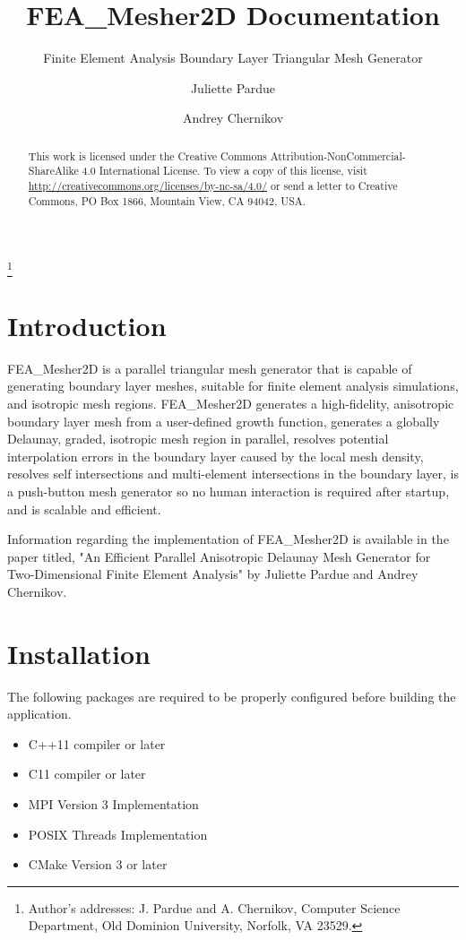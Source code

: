 \documentclass[manuscript, screen]{acmart}
\begin{document}
\title{FEA\_Mesher2D Documentation} 
 \subtitle{Finite Element Analysis Boundary Layer Triangular Mesh Generator}
\author{Juliette Pardue}
\author{Andrey Chernikov}

\begin{abstract}
This work is licensed under the Creative Commons Attribution-NonCommercial-ShareAlike 4.0 International License. To view a copy of this license, visit \url{http://creativecommons.org/licenses/by-nc-sa/4.0/} or send a letter to Creative Commons, PO Box 1866, Mountain View, CA 94042, USA.
\end{abstract}

\thanks{Author's addresses: J. Pardue {and} A. Chernikov, Computer Science Department, Old Dominion University, Norfolk, VA 23529.}

\maketitle

\section{Introduction}
FEA\_Mesher2D is a parallel triangular mesh generator that is capable of generating boundary layer meshes, suitable for finite element analysis simulations, and isotropic mesh regions. FEA\_Mesher2D generates a high-fidelity, anisotropic boundary layer mesh from a user-defined growth function, generates a globally Delaunay, graded, isotropic mesh region in parallel, resolves potential interpolation errors in the boundary layer caused by the local mesh density, resolves self intersections and multi-element intersections in the boundary layer, is a push-button mesh generator so no human interaction is required after startup, and is scalable and efficient.

Information regarding the implementation of FEA\_Mesher2D is available in the paper titled, "An Efficient Parallel Anisotropic Delaunay Mesh Generator for Two-Dimensional Finite Element Analysis" by Juliette Pardue and Andrey Chernikov.

\section{Installation}
The following packages are required to be properly configured before building the application.
\begin{itemize}
\item C++11 compiler or later
\item C11 compiler or later
\item MPI Version 3 Implementation
\item POSIX Threads Implementation
\item CMake Version 3 or later
\end{itemize}
\end{document}
